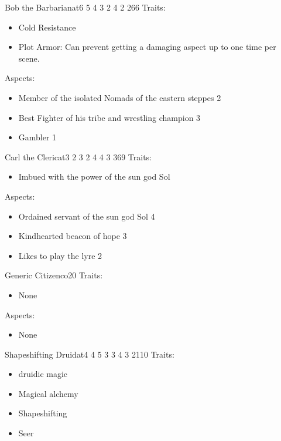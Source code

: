 \documentclass[11pt]{article}
\begin{document}
{\begin{npc}{Bob the Barbarian}{at}{6 5 4 3 2 4 2 2}{66}
Traits:
\begin{itemize}
\item Cold Resistance
\item Plot Armor: Can prevent getting a damaging aspect up to one time per scene.
\end{itemize}
\columnbreak

Aspects:
\begin{itemize}
\item Member of the isolated Nomads of the eastern steppes 2
\item Best Fighter of his tribe and wrestling champion 3
\item Gambler 1
\end{itemize}
\end{npc}

\begin{npc}{Carl the Cleric}{at}{3 2 3 2 4 4 3 3}{69}
Traits:
\begin{itemize}
\item Imbued with the power of the sun god Sol
\end{itemize}
\columnbreak

Aspects:
\begin{itemize}
\item Ordained servant of the sun god Sol 4
\item Kindhearted beacon of hope 3
\item Likes to play the lyre 2
\end{itemize}
\end{npc}

\begin{npc}{Generic Citizen}{co}{2}{0}
Traits:
\begin{itemize}
\item None
\end{itemize}

\columnbreak

Aspects:
\begin{itemize}
\item None
\end{itemize}
\end{npc}

\begin{npc}{Shapeshifting Druid}{at}{4 4 5 3 3 4 3 2}{110}
Traits:
\begin{itemize}
\item druidic magic
\item Magical alchemy
\item Shapeshifting
\item Seer
\end{itemize}


\end{npc}}
\end{document}
